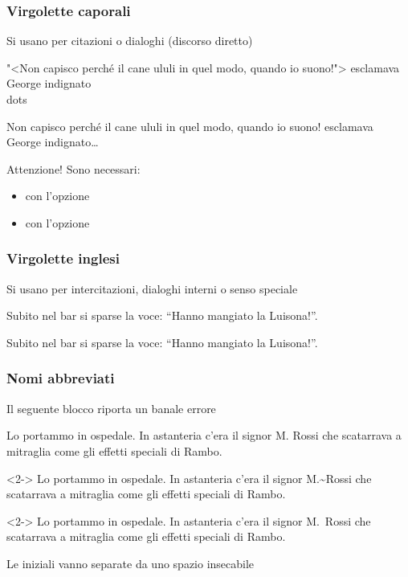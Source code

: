 \documentclass[svgnames,%
	ucs,%
	pdftex]{guitbeamer}
\begin{document}
\begin{frame}
  \frametitle{Virgolette caporali}
	Si usano per citazioni o dialoghi (discorso diretto)
	\begin{LaTeXcode}
		\alert{"<}Non capisco perch\'e il cane ululi in quel modo, quando io
		suono!\alert{">} esclamava George indignato\\dots
	\end{LaTeXcode}
	\begin{LaTeXoutput}
		{\selectfont\guillemotleft}Non capisco
		perch\'e il cane ululi in quel modo, quando io
		suono!{\selectfont\guillemotright}
		esclamava George indignato\dots
	\end{LaTeXoutput}
	\begin{block}{Attenzione!}
		Sono necessari:
		\begin{itemize}
			\item{} con l'opzione \LCmd[]{italian}
			\item{} con l'opzione \LCmd[]{T1}	
		\end{itemize}
	\end{block}
\end{frame}
\begin{frame}
  \frametitle{Virgolette inglesi}
	Si usano per intercitazioni, dialoghi interni o senso speciale
	\begin{LaTeXcode}
		Subito nel bar si sparse la voce: \alert{``}Hanno mangiato la
		Luisona!\alert{''}.
	\end{LaTeXcode}
	\begin{LaTeXoutput}
		Subito nel bar si sparse la voce: ``Hanno mangiato la Luisona!''.
	\end{LaTeXoutput}
\end{frame}
\begin{frame}
  \frametitle{Nomi abbreviati}
	Il seguente blocco riporta un banale errore
	\begin{LaTeXoutput}
		Lo portammo in ospedale. In astanteria c'era il signor M. 
		Rossi che scatarrava a mitraglia come gli effetti speciali di Rambo.
	\end{LaTeXoutput}
	\begin{LaTeXcode}<2->
		Lo portammo in ospedale. In astanteria c'era il signor M.\alert{\textasciitilde}Rossi che scatarrava a mitraglia come gli effetti speciali di Rambo.
	\end{LaTeXcode}
	\begin{LaTeXoutput}<2->
		Lo portammo in ospedale. In astanteria c'era il signor M.~Rossi che scatarrava a mitraglia come gli effetti speciali di Rambo.
	\end{LaTeXoutput}
  \smallskip
	Le iniziali vanno separate da uno spazio insecabile
\end{frame}
\end{document}
